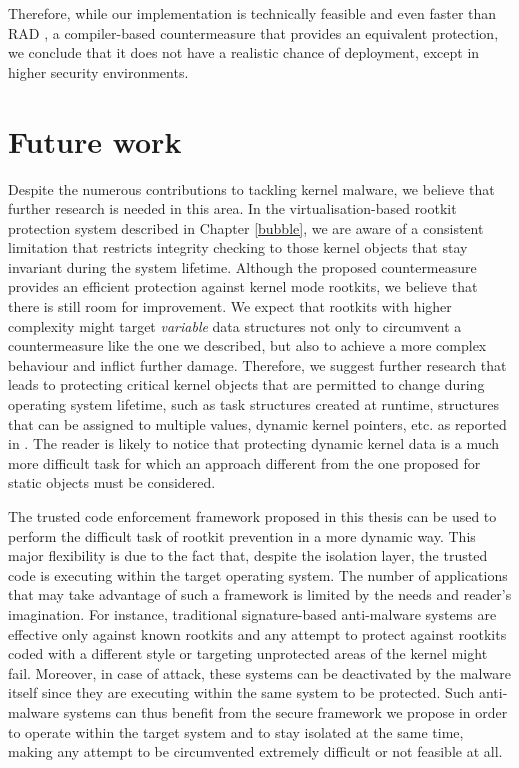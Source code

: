 Therefore, while our implementation is technically feasible and even faster than RAD \cite{Chiueh:2001:RCT}, a compiler-based countermeasure that provides an equivalent protection, we conclude that it does not have a realistic chance of deployment, except in higher security environments. 


\section{Future work}
Despite the numerous contributions to tackling kernel malware, we believe that further research is needed in this area. In the virtualisation-based rootkit protection system described in Chapter \ref{bubble}, we are aware of a consistent limitation that restricts integrity checking to those kernel objects that stay invariant during the system lifetime. 
Although the proposed countermeasure provides an efficient protection against kernel mode rootkits, we believe that there is still room for improvement. We expect that rootkits with higher complexity might target \emph{variable} data structures not only to circumvent a countermeasure like the one we described, but also to achieve a more complex behaviour and inflict further damage. Therefore, we suggest further research that leads to protecting critical kernel objects that are permitted to change during operating system lifetime, such as task structures created at runtime, structures that can be assigned to multiple values, dynamic kernel pointers, etc. as reported in \cite{dynamicdatakernel}. 
The reader is likely to notice that protecting dynamic kernel data is a much more difficult task for which an approach different from the one proposed for static objects must be considered. 

The trusted code enforcement framework proposed in this thesis can be used to perform the difficult task of rootkit prevention in a more dynamic way. This major flexibility is due to the fact that, despite the isolation layer, the trusted code is executing within the target operating system. The number of applications that may take advantage of such a framework is limited by the needs and reader's imagination. For instance, traditional signature-based anti-malware systems are effective only against known rootkits \cite{Mahapatra:2011:OCV:1988997.1989022} and any attempt to protect against rootkits coded with a different style or targeting unprotected areas of the kernel might fail. Moreover, in case of attack, these systems can be deactivated by the malware itself since they are executing within the same system to be protected. Such anti-malware systems can thus benefit from the secure framework we propose in order to operate within the target system and to stay isolated at the same time, making any attempt to be circumvented extremely difficult or not feasible at all. 
 

